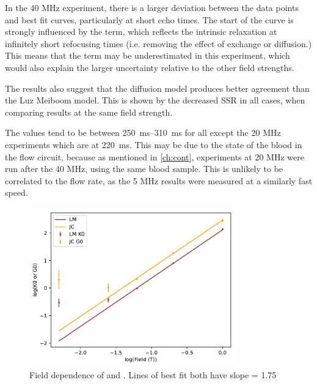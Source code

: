 In the 40 MHz experiment, there is a larger deviation between the data points and best fit curves, particularly at short echo times.
The start of the curve is strongly influenced by the \TtwoO term, which reflects the intrinsic relaxation at infinitely short refocusing times (i.e. removing the effect of exchange or diffusion.)
This means that the  \TtwoO term may be underestimated in this experiment, which would also explain the larger uncertainty relative to the other field strengths.

The results also suggest that the diffusion model produces better agreement than the Luz Meiboom model.
This is shown by the decreased SSR in all cases, when comparing results at the same field strength.

The \TtwoO values tend to be between \SIrange{250}{310}{ms} for all except the 20 MHz experiments which are at \SI{220}{ms}.
This may be due to the state of the blood in the flow circuit, because as mentioned in \autoref{ch:cont}, experiments at 20 MHz were run after the 40 MHz, using the same blood sample.
This is unlikely to be correlated to the flow rate, as the 5 MHz results were measured at a similarly fast speed.
\begin{figure}[h]
\centering
\includegraphics[width=0.8\textwidth]{figures/diffmodels/G0K0fieldloglog.pdf}
\caption[Field dependence of \Gzero and \Kzero]{Field dependence of \Gzero and \Kzero. Lines of best fit both have slope = 1.75}
\label{fig:dm-KGfield}
\end{figure}

